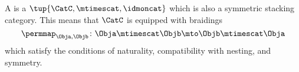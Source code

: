 {    

    \begin{ctdefinition}
        \label{def:symmetric-strict-monoidal-cat}
        A  is a  $\tup{\CatC, \mtimescat, \idmoncat}$ which is also a symmetric stacking category.
        This means that $\CatC$ is equipped with braidings
        \begin{equation}
            \permmap_{\Obja, \Objb} \colon \Obja \mtimescat \Objb \mto \Objb \mtimescat \Obja \end{equation}
        which satisfy the conditions of naturality, compatibility with nesting, and symmetry.
    \end{ctdefinition}

}
